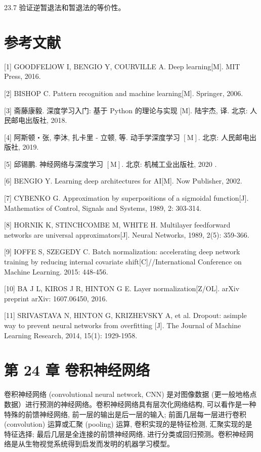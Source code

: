 \documentclass[10pt]{article}
\begin{document}
\begin{CJK*}{UTF8}{bsmi}
23.7 验证逆暂退法和暂退法的等价性。

\section*{参考文献}
[1] GOODFELlOW I, BENGIO Y, COURVILLE A. Deep learning[M]. MIT Press, 2016.

[2] BISHOP C. Pattern recognition and machine learning[M]. Springer, 2006.

[3] 斋藤康毅. 深度学习入门: 基于 Python 的理论与实现 [M]. 陆宇杰, 译. 北京: 人民邮电出版社, 2018.

[4] 阿斯顿・张, 李沐, 扎卡里 - 立顿, 等. 动手学深度学习 $[\mathrm{M}]$. 北京: 人民邮电出版社, 2019.

[5] 邱锡鹏. 神经网络与深度学习 $[\mathrm{M}]$. 北京: 机械工业出版社, 2020 .

[6] BENGIO Y. Learning deep architectures for AI[M]. Now Publisher, 2002.

[7] CYBENKO G. Approximation by superpositions of a sigmoidal function[J]. Mathematics of Control, Signals and Systems, 1989, 2: 303-314.

[8] HORNIK K, STINCHCOMBE M, WHITE H. Multilayer feedforward networks are universal approximators[J]. Neural Networks, 1989, 2(5): 359-366.

[9] IOFFE S, SZEGEDY C. Batch normalization: accelerating deep network training by reducing internal covariate shift[C]//International Conference on Machine Learning. 2015: 448-456.

[10] BA J L, KIROS J R, HINTON G E. Layer normalization[Z/OL]. arXiv preprint arXiv: 1607.06450, 2016.

[11] SRIVASTAVA N, HINTON G, KRIZHEVSKY A, et al. Dropout: asimple way to prevent neural networks from overfitting [J]. The Journal of Machine Learning Research, 2014, 15(1): 1929-1958.

\section*{第 24 章 卷积神经网络}
卷积神经网络 (convolutional neural network, CNN) 是对图像数据 (更一般地格点数据）进行预测的神经网络。卷积神经网络具有层次化网络结构, 可以看作是一种特殊的前馈神经网络, 前一层的输出是后一层的输入; 前面几层每一层进行卷积 (convolution) 运算或汇聚 (pooling) 运算, 卷积实现的是特征检测, 汇聚实现的是特征选择; 最后几层是全连接的前馈神经网络, 进行分类或回归预测。卷积神经网络是从生物视觉系统得到启发而发明的机器学习模型。


\end{CJK*}
\end{document}
